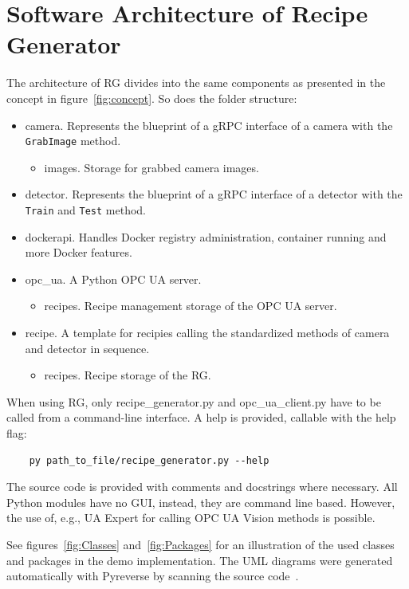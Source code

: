 \section{Software Architecture of Recipe Generator}
The architecture of RG divides into the same components as presented in the concept in figure~\ref{fig:concept}. So does the folder structure:
\begin{itemize}
    \item camera. Represents the blueprint of a gRPC interface of a camera with the \texttt{GrabImage} method.
    \begin{itemize}
        \item images. Storage for grabbed camera images.
    \end{itemize}
    \item detector. Represents the blueprint of a gRPC interface of a detector with the \texttt{Train} and \texttt{Test} method.
    \item dockerapi. Handles Docker registry administration, container running and more Docker features.
    \item opc\_ua. A Python OPC UA server.
    \begin{itemize}
        \item recipes. Recipe management storage of the OPC UA server.
    \end{itemize}
    \item recipe. A template for recipies calling the standardized methods of camera and detector in sequence.
    \begin{itemize}
        \item recipes. Recipe storage of the RG.
    \end{itemize}
\end{itemize}

When using RG, only recipe\_generator.py and opc\_ua\_client.py have to be called from a command-line interface. A help is provided, callable with the help flag:

\begin{verbatim}
    py path_to_file/recipe_generator.py --help
\end{verbatim}

The source code is provided with comments and docstrings where necessary. All Python modules have no GUI, instead, they are command line based. However, the use of, e.g., UA Expert for calling OPC UA Vision methods is possible. 

See figures~\ref{fig:Classes} and~\ref{fig:Packages} for an illustration of the used classes and packages in the demo implementation. The UML diagrams were generated automatically with Pyreverse by scanning the source code~\cite{Anclin2008Pyreverse2019}.


